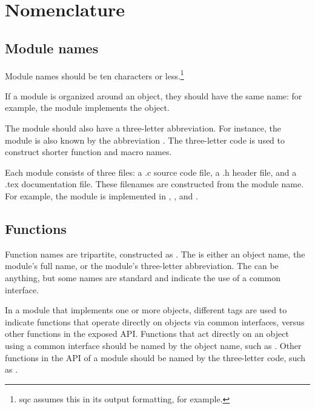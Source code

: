 \section{Nomenclature}

   \subsection{Module names}

Module names should be ten characters or less.\footnote{sqc assumes
  this in its output formatting, for example.}

If a module is organized around an object, they should have the same
name: for example, the  module implements the
 object.

The module should also have a three-letter abbreviation. For instance,
the  module is also known by the abbreviation
. The three-letter code is used to construct shorter
function and macro names.

Each module consists of three files: a .c source code file, a .h
header file, and a .tex documentation file. These filenames are
constructed from the module name. For example, the 
module is implemented in ,
, and .


   \subsection{Functions}

Function names are tripartite, constructed as
.  The  is either an
object name, the module's full name, or the module's three-letter
abbreviation. The  can be anything, but some names are
standard and indicate the use of a common interface.

In a module that implements one or more objects, different tags are
used to indicate functions that operate directly on objects via common
interfaces, versus other functions in the exposed API.  Functions that
act directly on an object using a common interface should be named by
the object name, such as . Other functions in the API of
a module should be named by the three-letter code, such as
.

